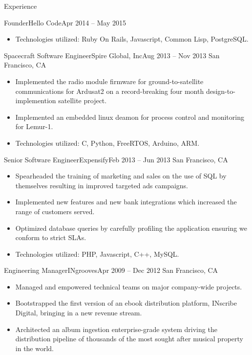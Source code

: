 \documentclass[calibri]{mcdowellcv}
\begin{document}
\begin{cvsection}{Experience}
\begin{cvsubsection}{Founder}{Hello Code}{Apr 2014 -- May 2015}
\begin{itemize}
			\item Technologies utilized: Ruby On Rails, Javascript, Common Lisp, PostgreSQL.
		\end{itemize}
	\end{cvsubsection}
	\vskip 0.3in
	\begin{cvsubsection}{Spacecraft Software Engineer}{Spire Global, Inc}{Aug 2013 -- Nov 2013}
		San Francisco, CA
		\begin{itemize}%
			\item Implemented the radio module firmware for ground-to-satellite communications for Ardusat2 on a record-breaking four month design-to-implemention satellite project.
			\item Implemented an embedded linux deamon for process control and monitoring for Lemur-1.
			\item Technologies utilized: C, Python, FreeRTOS, Arduino, ARM.
		\end{itemize}
	\end{cvsubsection}
	\vskip 0.3in
	\begin{cvsubsection}{Senior Software Engineer}{Expensify}{Feb 2013 -- Jun 2013}
		San Francisco, CA
		\begin{itemize}%
			\item Spearheaded the training of marketing and sales on the use of SQL by themselves resulting in improved targeted ads campaigns.
			\item Implemented new features and new bank integrations which increased the range of customers served.
			\item Optimized database queries by carefully profiling the application ensuring we conform to strict SLAs.
			\item Technologies utilized: PHP, Javascript, C++, MySQL.
		\end{itemize}
	\end{cvsubsection}
	\vskip 0.3in
	\begin{cvsubsection}{Engineering Manager}{INgrooves}{Apr 2009 -- Dec 2012}
		San Francisco, CA
		\begin{itemize}%
			\item Managed and empowered technical teams on major company-wide projects.
			\item Bootstrapped the first version of an ebook distribution platform, INscribe Digital, bringing in a new revenue stream.
			\item Architected an album ingestion enterprise-grade system driving the distribution pipeline of thousands of the most sought after musical property in the world.

\end{itemize}
\end{cvsubsection}
\end{cvsection}
\end{document}

